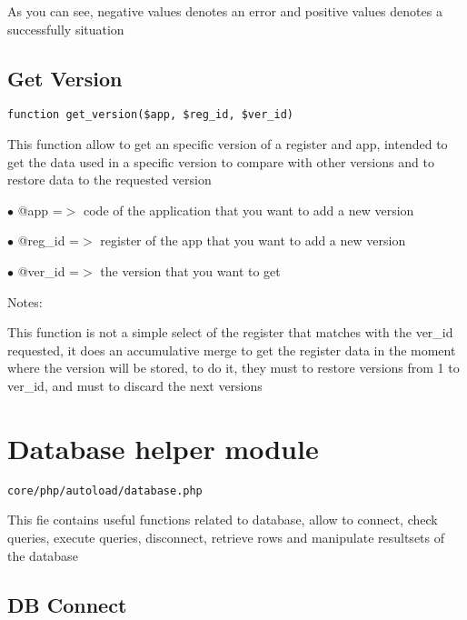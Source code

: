 \documentclass[a4paper]{book}
\begin{document}
As you can see, negative values denotes an error and positive values denotes a successfully situation

\hypertarget{toc56}{}
\subsection{Get Version}

\begin{lstlisting}
function get_version($app, $reg_id, $ver_id)
\end{lstlisting}

This function allow to get an specific version of a register and app, intended
to get the data used in a specific version to compare with other versions and
to restore data to the requested version

\begin{compactitem}
\item[\color{myblue}$\bullet$] @app    =$>$ code of the application that you want to add a new version
\item[\color{myblue}$\bullet$] @reg\_id =$>$ register of the app that you want to add a new version
\item[\color{myblue}$\bullet$] @ver\_id =$>$ the version that you want to get
\end{compactitem}

Notes:

This function is not a simple select of the register that matches with the
ver\_id requested, it does an accumulative merge to get the register data
in the moment where the version will be stored, to do it, they must to
restore versions from 1 to ver\_id, and must to discard the next versions

\hypertarget{toc57}{}
\section{Database helper module}

\begin{lstlisting}
core/php/autoload/database.php
\end{lstlisting}

This fie contains useful functions related to database, allow to connect, check queries, execute
queries, disconnect, retrieve rows and manipulate resultsets of the database

\hypertarget{toc58}{}
\subsection{DB Connect}
\end{document}
